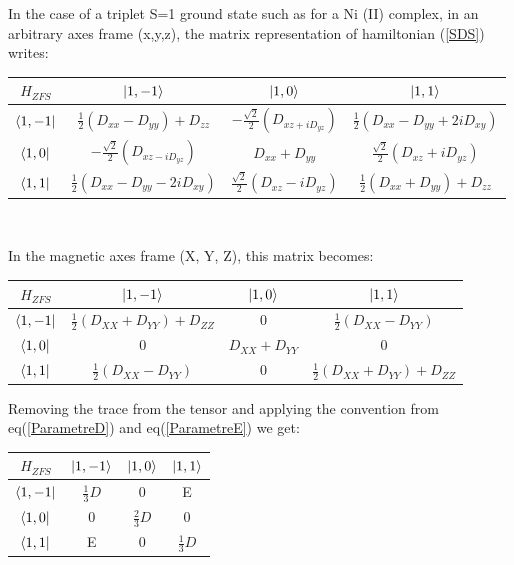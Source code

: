 \documentclass[12pt]{report}
\numberwithin{equation}{section}
\begin{document}
In the case of a triplet S=1 ground state such as for a Ni (II) complex, in an arbitrary axes frame (x,y,z), the matrix representation of hamiltonian (\ref{SDS}) writes:
\begin{center}
    \begin{tabular}{ c | c c c}
        $H_{ZFS}$ & $\ket{1,-1}$ & $\ket{1,0} $& $\ket{1,1}$ \\
        \hline
        $\bra{1,-1} $&  $\frac{1}{2}(D_{xx}-D_{yy})+D_{zz}$ & $-\frac{\sqrt{2}}{2}(D_{xz+iD_{yz}}) $ & $\frac{1}{2}(D_{xx}-D_{yy}+2iD_{xy})$ \\
        $\bra{1,0}$ & $-\frac{\sqrt{2}}{2}(D_{xz-iD_{yz}})  $& $ D_{xx}+D_{yy}  $&$ \frac{\sqrt{2}}{2}(D_{xz}+iD_{yz})$ \\
        $\bra{1,1} $& $ \frac{1}{2}(D_{xx}-D_{yy}-2iD_{xy}) $& $\frac{\sqrt{2}}{2}(D_{xz}-iD_{yz})$  & $\frac{1}{2}(D_{xx}+D_{yy})+D_{zz} $ \\
    \end{tabular}\\
\end{center}
In the magnetic axes frame (X, Y, Z), this matrix becomes:
\begin{center}
\begin{tabular}{c | c c c}
    $H_{ZFS}$ & $\ket{1,-1}$ & $\ket{1,0} $& $\ket{1,1}$ \\
    \hline
    $\bra{1,-1}$ & $\frac{1}{2}(D_{XX}+D_{YY})+D_{ZZ}$ & 0 & $\frac{1}{2}(D_{XX}-D_{YY})$\\
    $\bra{1,0}$ & 0 & $D_{XX}+D_{YY}$ & 0\\
    $\bra{1,1}$ &  $\frac{1}{2}(D_{XX}-D_{YY})$ & 0 & $\frac{1}{2}(D_{XX}+D_{YY})+D_{ZZ}$
\end{tabular}
\end{center}
Removing the trace from the tensor and applying the convention from eq(\ref{ParametreD}) and eq(\ref{ParametreE}) we get:
\begin{center}
\begin{tabular}{c | c c c}
    $H_{ZFS}$ & $\ket{1,-1}$ & $\ket{1,0}$ & $\ket{1,1}$\\
    \hline
    $\bra{1,-1}$ & $\frac{1}{3}D$ & 0 & E\\
    $\bra{1,0}$ & 0 & $\frac{2}{3}D $& 0\\
    $\bra{1,1}$ & E & 0 & $\frac{1}{3}D$
\end{tabular}
\end{center}
\end{document}
